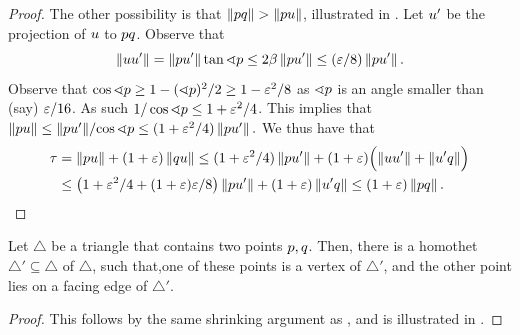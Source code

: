 \documentclass[12pt]{article}%
\begin{document}
\begin{proof}
    The other possibility is that $\left\| p q \right\| > \left\| p u \right\|$,
    illustrated in .  Let $u'$ be the
    projection of $u$ to $p q$. Observe that
    \begin{equation*}
        \dY{\pc}{\pc'}%
        =%
        \dY{\pa}{\pc'} \tan \angleX{\pa}%
        \leq%
        2\beta\dY{\pa}{\pc'} \leq (\eps/8) \dY{\pa}{\pc'}.
    \end{equation*}
    Observe that
    $\cos \sphericalangle p \geq 1 - (\sphericalangle p)^2/2 \geq 1-\varepsilon^2/8$ as
    $\sphericalangle p$ is an angle smaller than (say) $\varepsilon/16$.  As such
    $1/\cos \sphericalangle p \leq 1+\varepsilon^2/4$.
    This implies that 
    \begin{math}
        \dY{\pa}{\pc}%
        \leq%
        {\dY{\pa}{\pc'}} / {\cos \angleX{\pa} } \leq %
        (1+\eps^2/4)\dY{\pa}{\pc'}.
    \end{math}
    We thus have that
    \begin{align*}
      \tau
      &=%
        \dY{\pa}{\pc}%
        +%
        (1+\eps)\dY{\pb}{\pc}%
        \leq%
        (1+\eps^2/4)\dY{\pa}{\pc'}
        +(1+\eps)\pth{ \Bigl.
        \dY{\pc}{\pc'} + \dY{\pc'}{\pb}}
      \\&
      \leq%
      \bigl(1+\eps^2/4 + (1+\eps)\eps/8\bigr)\dY{\pa}{\pc'} 
      + (1+\eps)\dY{\pc'}{\pb}
      \leq%
      (1+\eps)\dY{\pa}{\pb}.
    \end{align*}
\end{proof}

\begin{lemma}
    Let $\triangle$ be a triangle that contains two points $p,
    q$. Then, there is a homothet $\triangle'\subseteq \triangle$ of
    $\triangle$, such that,one of these points is a vertex of
    $\triangle'$, and the other point lies on a facing edge of
    $\triangle'$.
\end{lemma}

\begin{proof}
    This follows by the same shrinking argument as
    , and is illustrated in 
    .   
\end{proof}
\end{document}
